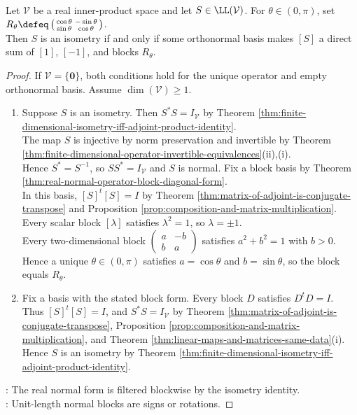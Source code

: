 \begin{theorem} \label{thm:real-isometry-block-diagonal-form} \\
Let $\mathcal{V}$ be a real inner-product space and let $S\in\LL(\mathcal{V})$. For $\theta\in(0,\pi)$, set $R_{\theta}\defeq\left(\begin{smallmatrix}\cos\theta&-\sin\theta\\\sin\theta&\cos\theta\end{smallmatrix}\right)$.\\
Then $S$ is an isometry if and only if some orthonormal basis makes $[S]$ a direct sum of $[1]$, $[-1]$, and blocks $R_{\theta}$.
\begin{proof}
If $\mathcal{V}=\{\mathbf{0}\}$, both conditions hold for the unique operator and empty orthonormal basis. Assume $\dim(\mathcal{V})\geq1$.
\begin{enumerate}[label=\roman*.]
\setlength{\itemsep}{0pt}
\item[$(\Rightarrow)$] Suppose $S$ is an isometry. Then $S^*S=I_{\mathcal{V}}$ by Theorem \ref{thm:finite-dimensional-isometry-iff-adjoint-product-identity}.\\
The map $S$ is injective by norm preservation and invertible by Theorem \ref{thm:finite-dimensional-operator-invertible-equivalences}(ii),(i).\\
Hence $S^*=S^{-1}$, so $SS^*=I_{\mathcal{V}}$ and $S$ is normal. Fix a block basis by Theorem \ref{thm:real-normal-operator-block-diagonal-form}.\\
In this basis, $[S]^t[S]=I$ by Theorem \ref{thm:matrix-of-adjoint-is-conjugate-transpose} and Proposition \ref{prop:composition-and-matrix-multiplication}. Every scalar block $[\lambda]$ satisfies $\lambda^2=1$, so $\lambda=\pm1$.\\
Every two-dimensional block $\left(\begin{smallmatrix}a&-b\\b&a\end{smallmatrix}\right)$ satisfies $a^2+b^2=1$ with $b>0$.\\
Hence a unique $\theta\in(0,\pi)$ satisfies $a=\cos\theta$ and $b=\sin\theta$, so the block equals $R_{\theta}$.
\item[$(\Leftarrow)$] Fix a basis with the stated block form. Every block $D$ satisfies $D^tD=I$.\\
Thus $[S]^t[S]=I$, and $S^*S=I_{\mathcal{V}}$ by Theorem \ref{thm:matrix-of-adjoint-is-conjugate-transpose}, Proposition \ref{prop:composition-and-matrix-multiplication}, and Theorem \ref{thm:linear-maps-and-matrices-same-data}(i).\\
Hence $S$ is an isometry by Theorem \ref{thm:finite-dimensional-isometry-iff-adjoint-product-identity}.
\end{enumerate}
: The real normal form is filtered blockwise by the isometry identity.\\
: Unit-length normal blocks are signs or rotations.
\end{proof}
\end{theorem}

